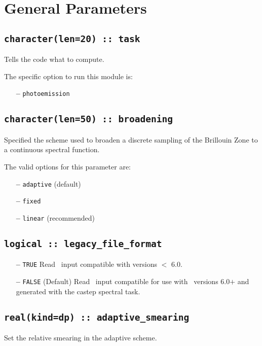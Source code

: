 \documentclass[a4paper,11pt,twoside]{book}
\begin{document}
\clearpage


\section{General Parameters}
\subsection[task]{\tt character(len=20) :: task}

Tells the code what to compute.

The specific option to run this module is:
\begin{itemize}
\item[{\bf --}]  \verb#photoemission#

\end{itemize}


\subsection[broadening]{\tt character(len=50) :: broadening}

Specified the scheme used to broaden a discrete sampling of the
Brillouin Zone to a continuous spectral function.

The valid options for this parameter are:
\begin{itemize}
\item[{\bf --}]  \verb#adaptive# (default)
\item[{\bf --}]  \verb#fixed#
\item[{\bf --}]  \verb#linear# (recommended)
\end{itemize}

\subsection[adaptive\_smearing]{\tt logical :: legacy\_file\_format}
\label{sect:lff}
\begin{itemize}
\item[{\bf --}] \verb#TRUE#  Read \castep\ input compatible with versions $<$ 6.0.
\item[{\bf --}] \verb#FALSE# (Default) Read \castep\ input compatible for use with \castep\ versions 6.0$+$ and generated with the castep spectral task.
\end{itemize}

\subsection[adaptive\_smearing]{\tt real(kind=dp) :: adaptive\_smearing}
Set the relative smearing in the adaptive scheme.
\end{document}

